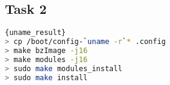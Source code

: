 \documentclass[12pt, a4paper, twocolumn]{article}
\begin{document}
\subsection{Task 2}


\noindent\begin{minipage}{.45\textwidth}
\begin{lstlisting}[language=bash, caption=Fetch Sources,frame=tlrb]{uname_result}
> cp /boot/config-`uname -r`* .config
> make bzImage -j16
> make modules -j16
> sudo make modules_install
> sudo make install
\end{lstlisting}
\end{minipage}\hfill
\end{document}
